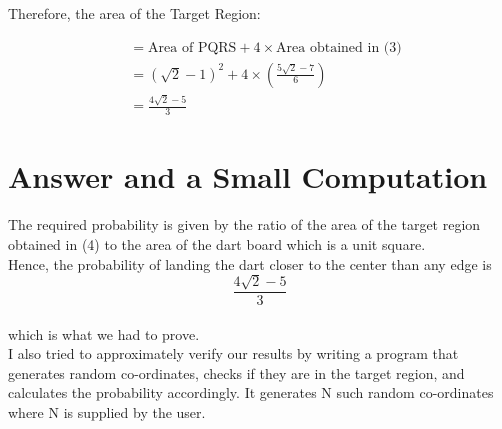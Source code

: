 \documentclass[10pt]{article}
\begin{document}
Therefore, the area of the Target Region:

\begin{equation}
\begin{split}
&= \text{Area of PQRS} + 4 \times \text{Area obtained in (3)}\\
&= {(\sqrt{2} - 1)}^2 + 4 \times \left(\frac{5\sqrt{2} - 7}{6}\right)\\
&= \frac{4\sqrt{2} - 5}{3}
\end{split}
\end{equation}
\newpage
\section{Answer and a Small Computation}
The required probability is given by the ratio of the area of the target region obtained in (4) to the area of the dart board which is a unit square.\\

Hence, the probability of landing the dart closer to the center than any edge is $$\frac{4\sqrt{2} - 5}{3}$$\\
which is what we had to prove.\\

I also tried to approximately verify our results by writing a program that generates random co-ordinates, checks if they are in the target region, and calculates the probability accordingly. It generates N such random co-ordinates where N is supplied by the user.
\end{document}
